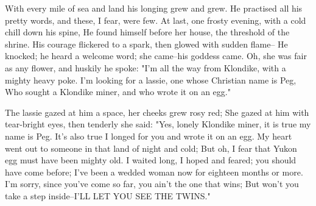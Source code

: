 \begin{poemblock}
 With every mile of sea and land his longing grew and grew.
 He practised all his pretty words, and these, I fear, were few.
 At last, one frosty evening, with a cold chill down his spine,
 He found himself before her house, the threshold of the shrine.
 His courage flickered to a spark, then glowed with sudden flame--
 He knocked; he heard a welcome word; she came--his goddess came.
 Oh, she was fair as any flower, and huskily he spoke:
 "I'm all the way from Klondike, with a mighty heavy poke.
 I'm looking for a lassie, one whose Christian name is Peg,
 Who sought a Klondike miner, and who wrote it on an egg."

 The lassie gazed at him a space, her cheeks grew rosy red;
 She gazed at him with tear-bright eyes, then tenderly she said:
 "Yes, lonely Klondike miner, it is true my name is Peg.
 It's also true I longed for you and wrote it on an egg.
 My heart went out to someone in that land of night and cold;
 But oh, I fear that Yukon egg must have been mighty old.
 I waited long, I hoped and feared; you should have come before;
 I've been a wedded woman now for eighteen months or more.
 I'm sorry, since you've come so far, you ain't the one that wins;
 But won't you take a step inside--I'LL LET YOU SEE THE TWINS."
\end{poemblock}

